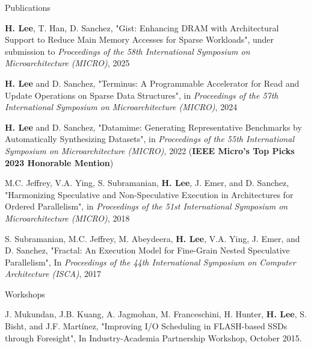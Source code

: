 \documentclass{resume} %
\begin{document}
\begin{rSection}{Publications}

{\bf H. Lee}, T. Han, D. Sanchez,
"Gist: Enhancing DRAM with Architectural Support to Reduce Main Memory Accesses for Sparse Workloads",
under submission to \textit{Proceedings of the 58th International Symposium on Microarchitecture (MICRO)}, 2025 %

{\bf H. Lee} and D. Sanchez,
"Terminus: A Programmable Accelerator for Read and Update Operations on Sparse Data Structures",
in \textit{Proceedings of the 57th International Symposium on Microarchitecture (MICRO)}, 2024 %

{\bf H. Lee} and D. Sanchez,
"Datamime: Generating Representative Benchmarks by Automatically Synthesizing Datasets",
in \textit{Proceedings of the 55th International Symposium on Microarchitecture (MICRO)}, 2022 %
(\textbf{IEEE Micro's Top Picks 2023 Honorable Mention})

M.C. Jeffrey, V.A. Ying, S. Subramanian, {\bf H. Lee}, J. Emer, and D. Sanchez,
"Harmonizing Speculative and Non-Speculative Execution in Architectures for Ordered Parallelism",
in \textit{Proceedings of the 51st International Symposium on Microarchitecture (MICRO)}, 2018 %

S. Subramanian, M.C. Jeffrey, M. Abeydeera, {\bf H. Lee}, V.A. Ying, J. Emer, and D. Sanchez, 
"Fractal: An Execution Model for Fine-Grain Nested Speculative Parallelism",
In \textit{Proceedings of the 44th International Symposium on Computer Architecture (ISCA)}, 2017 %

\end{rSection}


\begin{rSection}{Workshops}

J. Mukundan, J.B. Kuang, A. Jagmohan, M. Franceschini, H. Hunter, {\bf H. Lee}, S. Bisht, and J.F. Martínez, "Improving I/O Scheduling in FLASH-based SSDs through Foresight", In Industry-Academia Partnership Workshop, October 2015.

\end{rSection}

\end{document}
